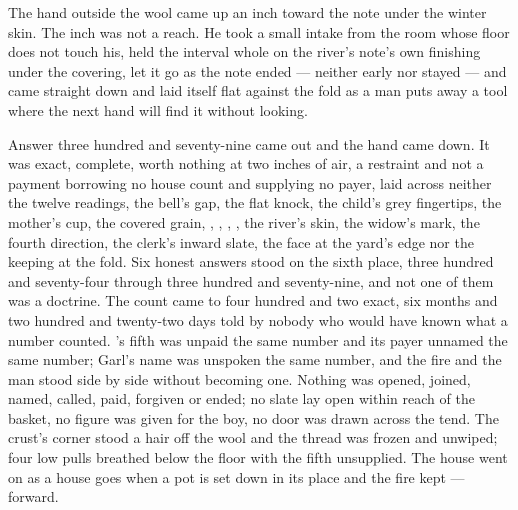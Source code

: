 The hand outside the wool came up an inch toward the note under the winter skin. The inch was not a reach. He took a small intake from the room whose floor does not touch his, held the interval whole on the river's note's own finishing under the covering, let it go as the note ended --- neither early nor stayed --- and came straight down and laid itself flat against the fold as a man puts away a tool where the next hand will find it without looking.

Answer three hundred and seventy-nine came out and the hand came down. It was exact, complete, worth nothing at two inches of air, a restraint and not a payment borrowing no house count and supplying no payer, laid across neither the twelve readings, the bell's gap, the flat knock, the child's grey fingertips, the mother's cup, the covered grain, , , , , the river's skin, the widow's mark, the fourth direction, the clerk's inward slate, the face at the yard's edge nor the keeping at the fold. Six honest answers stood on the sixth place, three hundred and seventy-four through three hundred and seventy-nine, and not one of them was a doctrine. The count came to four hundred and two exact, six months and two hundred and twenty-two days told by nobody who would have known what a number counted. 's fifth was unpaid the same number and its payer unnamed the same number; Garl's name was unspoken the same number, and the fire and the man stood side by side without becoming one. Nothing was opened, joined, named, called, paid, forgiven or ended; no slate lay open within reach of the basket, no figure was given for the boy, no door was drawn across the tend. The crust's corner stood a hair off the wool and the thread was frozen and unwiped; four low pulls breathed below the floor with the fifth unsupplied. The house went on as a house goes when a pot is set down in its place and the fire kept --- forward.
